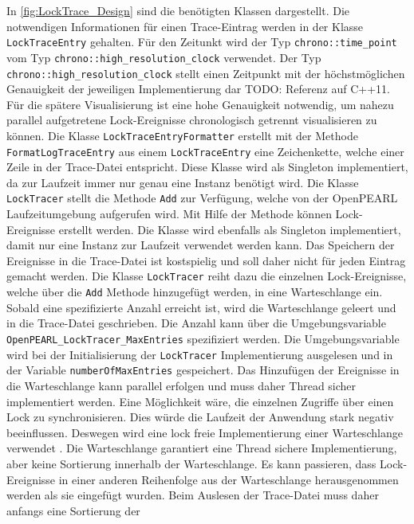 In \cref{fig:LockTrace_Design} sind die benötigten Klassen dargestellt. Die
notwendigen Informationen für einen Trace-Eintrag werden in der Klasse
\texttt{LockTraceEntry} gehalten. Für den Zeitunkt wird der Typ 
\texttt{chrono::time\_point} vom Typ \texttt{chrono::high\_resolution\_clock}
verwendet. Der Typ \texttt{chrono::high\_resolution\_clock} stellt einen
Zeitpunkt mit der höchstmöglichen Genauigkeit der jeweiligen Implementierung dar
{TODO: Referenz auf C++11}. Für die spätere Visualisierung ist eine hohe
Genauigkeit notwendig, um nahezu parallel aufgetretene Lock-Ereignisse
chronologisch getrennt visualisieren zu können. Die Klasse
\texttt{LockTraceEntryFormatter} erstellt mit der Methode
\texttt{FormatLogTraceEntry} aus einem \texttt{LockTraceEntry} eine
Zeichenkette, welche einer Zeile in der Trace-Datei entspricht. Diese Klasse
wird als Singleton implementiert, da zur Laufzeit immer nur genau eine Instanz
benötigt wird. Die Klasse \texttt{LockTracer} stellt die Methode \texttt{Add}
zur Verfügung, welche von der OpenPEARL Laufzeitumgebung aufgerufen wird. Mit
Hilfe der Methode können Lock-Ereignisse erstellt werden. Die Klasse wird
ebenfalls als Singleton implementiert, damit nur eine Instanz zur Laufzeit
verwendet werden kann. Das Speichern der Ereignisse in die Trace-Datei ist
kostspielig und soll daher nicht für jeden Eintrag gemacht werden. Die Klasse
\texttt{LockTracer} reiht dazu die einzelnen Lock-Ereignisse, welche über die
\texttt{Add} Methode hinzugefügt werden, in eine Warteschlange ein. Sobald eine
spezifizierte Anzahl erreicht ist, wird die Warteschlange geleert und in die
Trace-Datei geschrieben. Die Anzahl kann über die Umgebungsvariable
\texttt{OpenPEARL\_LockTracer\_MaxEntries} spezifiziert werden. Die
Umgebungsvariable wird bei der Initialisierung der \texttt{LockTracer}
Implementierung ausgelesen und in der Variable \texttt{numberOfMaxEntries}
gespeichert. Das Hinzufügen der Ereignisse in die Warteschlange kann parallel
erfolgen und muss daher Thread sicher implementiert werden. Eine Möglichkeit
wäre, die einzelnen Zugriffe über einen Lock zu synchronisieren. Dies würde die
Laufzeit der Anwendung stark negativ beeinflussen. Deswegen wird eine lock freie
Implementierung einer Warteschlange verwendet
\autocite{Moody_Camels_Concurrentqueue}. Die Warteschlange garantiert eine
Thread sichere Implementierung, aber keine Sortierung innerhalb der
Warteschlange. Es kann passieren, dass Lock-Ereignisse in einer anderen
Reihenfolge aus der Warteschlange herausgenommen werden als sie eingefügt
wurden. Beim Auslesen der Trace-Datei muss daher anfangs eine Sortierung der
